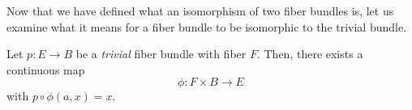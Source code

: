 %

Now that we have defined what an isomorphism of two fiber bundles is, let us examine what it means for a fiber bundle to be isomorphic to the trivial bundle.

\begin{remark}
Let $p:E\to B$ be a \emph{trivial} fiber bundle with fiber $F$. Then, there exists a continuous map
\[\phi:F\times B\to E\]
with $p\circ\phi(a,x)=x$.
\end{remark}








%
%
%
%
%
